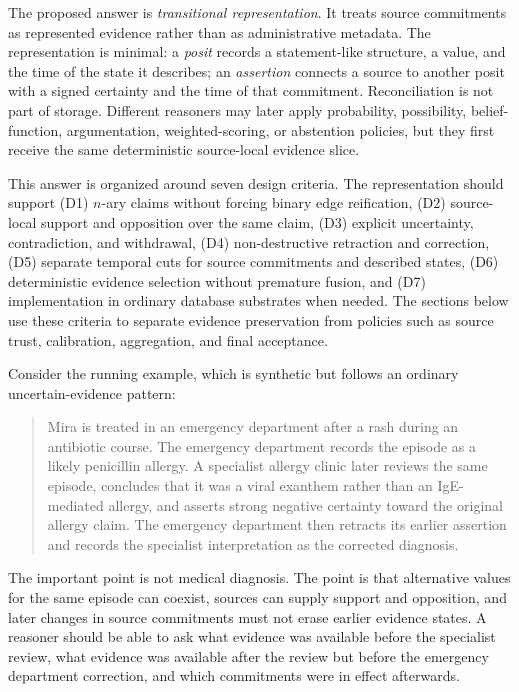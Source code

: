 \documentclass[a4paper,fleqn]{cas-sc}
\theoremstyle{plain}
\theoremstyle{remark}
\begin{document}
The proposed answer is \emph{transitional representation}. It treats source commitments as represented evidence rather than as administrative metadata. The representation is minimal: a \emph{posit} records a statement-like structure, a value, and the time of the state it describes; an \emph{assertion} connects a source to another posit with a signed certainty and the time of that commitment. Reconciliation is not part of storage. Different reasoners may later apply probability, possibility, belief-function, argumentation, weighted-scoring, or abstention policies, but they first receive the same deterministic source-local evidence slice.

This answer is organized around seven design criteria. The representation should support (D1) \(n\)-ary claims without forcing binary edge reification, (D2) source-local support and opposition over the same claim, (D3) explicit uncertainty, contradiction, and withdrawal, (D4) non-destructive retraction and correction, (D5) separate temporal cuts for source commitments and described states, (D6) deterministic evidence selection without premature fusion, and (D7) implementation in ordinary database substrates when needed. The sections below use these criteria to separate evidence preservation from policies such as source trust, calibration, aggregation, and final acceptance.

Consider the running example, which is synthetic but follows an ordinary uncertain-evidence pattern:
\begin{quote}
\small
Mira is treated in an emergency department after a rash during an antibiotic course. The emergency department records the episode as a likely penicillin allergy. A specialist allergy clinic later reviews the same episode, concludes that it was a viral exanthem rather than an IgE-mediated allergy, and asserts strong negative certainty toward the original allergy claim. The emergency department then retracts its earlier assertion and records the specialist interpretation as the corrected diagnosis.
\end{quote}
The important point is not medical diagnosis. The point is that alternative values for the same episode can coexist, sources can supply support and opposition, and later changes in source commitments must not erase earlier evidence states. A reasoner should be able to ask what evidence was available before the specialist review, what evidence was available after the review but before the emergency department correction, and which commitments were in effect afterwards.
\end{document}
